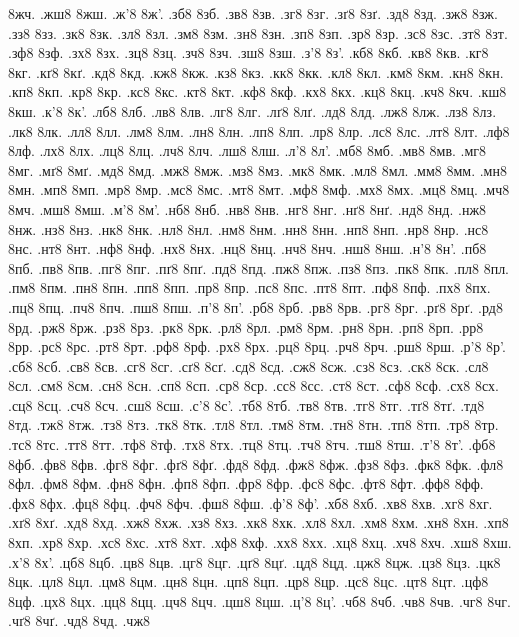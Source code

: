 {8жч.
.жш8
8жш.
.ж'8
8ж'.
.зб8
8зб.
.зв8
8зв.
.зг8
8зг.
.зґ8
8зґ.
.зд8
8зд.
.зж8
8зж.
.зз8
8зз.
.зк8
8зк.
.зл8
8зл.
.зм8
8зм.
.зн8
8зн.
.зп8
8зп.
.зр8
8зр.
.зс8
8зс.
.зт8
8зт.
.зф8
8зф.
.зх8
8зх.
.зц8
8зц.
.зч8
8зч.
.зш8
8зш.
.з'8
8з'.
.кб8
8кб.
.кв8
8кв.
.кг8
8кг.
.кґ8
8кґ.
.кд8
8кд.
.кж8
8кж.
.кз8
8кз.
.кк8
8кк.
.кл8
8кл.
.км8
8км.
.кн8
8кн.
.кп8
8кп.
.кр8
8кр.
.кс8
8кс.
.кт8
8кт.
.кф8
8кф.
.кх8
8кх.
.кц8
8кц.
.кч8
8кч.
.кш8
8кш.
.к'8
8к'.
.лб8
8лб.
.лв8
8лв.
.лг8
8лг.
.лґ8
8лґ.
.лд8
8лд.
.лж8
8лж.
.лз8
8лз.
.лк8
8лк.
.лл8
8лл.
.лм8
8лм.
.лн8
8лн.
.лп8
8лп.
.лр8
8лр.
.лс8
8лс.
.лт8
8лт.
.лф8
8лф.
.лх8
8лх.
.лц8
8лц.
.лч8
8лч.
.лш8
8лш.
.л'8
8л'.
.мб8
8мб.
.мв8
8мв.
.мг8
8мг.
.мґ8
8мґ.
.мд8
8мд.
.мж8
8мж.
.мз8
8мз.
.мк8
8мк.
.мл8
8мл.
.мм8
8мм.
.мн8
8мн.
.мп8
8мп.
.мр8
8мр.
.мс8
8мс.
.мт8
8мт.
.мф8
8мф.
.мх8
8мх.
.мц8
8мц.
.мч8
8мч.
.мш8
8мш.
.м'8
8м'.
.нб8
8нб.
.нв8
8нв.
.нг8
8нг.
.нґ8
8нґ.
.нд8
8нд.
.нж8
8нж.
.нз8
8нз.
.нк8
8нк.
.нл8
8нл.
.нм8
8нм.
.нн8
8нн.
.нп8
8нп.
.нр8
8нр.
.нс8
8нс.
.нт8
8нт.
.нф8
8нф.
.нх8
8нх.
.нц8
8нц.
.нч8
8нч.
.нш8
8нш.
.н'8
8н'.
.пб8
8пб.
.пв8
8пв.
.пг8
8пг.
.пґ8
8пґ.
.пд8
8пд.
.пж8
8пж.
.пз8
8пз.
.пк8
8пк.
.пл8
8пл.
.пм8
8пм.
.пн8
8пн.
.пп8
8пп.
.пр8
8пр.
.пс8
8пс.
.пт8
8пт.
.пф8
8пф.
.пх8
8пх.
.пц8
8пц.
.пч8
8пч.
.пш8
8пш.
.п'8
8п'.
.рб8
8рб.
.рв8
8рв.
.рг8
8рг.
.рґ8
8рґ.
.рд8
8рд.
.рж8
8рж.
.рз8
8рз.
.рк8
8рк.
.рл8
8рл.
.рм8
8рм.
.рн8
8рн.
.рп8
8рп.
.рр8
8рр.
.рс8
8рс.
.рт8
8рт.
.рф8
8рф.
.рх8
8рх.
.рц8
8рц.
.рч8
8рч.
.рш8
8рш.
.р'8
8р'.
.сб8
8сб.
.св8
8св.
.сг8
8сг.
.сґ8
8сґ.
.сд8
8сд.
.сж8
8сж.
.сз8
8сз.
.ск8
8ск.
.сл8
8сл.
.см8
8см.
.сн8
8сн.
.сп8
8сп.
.ср8
8ср.
.сс8
8сс.
.ст8
8ст.
.сф8
8сф.
.сх8
8сх.
.сц8
8сц.
.сч8
8сч.
.сш8
8сш.
.с'8
8с'.
.тб8
8тб.
.тв8
8тв.
.тг8
8тг.
.тґ8
8тґ.
.тд8
8тд.
.тж8
8тж.
.тз8
8тз.
.тк8
8тк.
.тл8
8тл.
.тм8
8тм.
.тн8
8тн.
.тп8
8тп.
.тр8
8тр.
.тс8
8тс.
.тт8
8тт.
.тф8
8тф.
.тх8
8тх.
.тц8
8тц.
.тч8
8тч.
.тш8
8тш.
.т'8
8т'.
.фб8
8фб.
.фв8
8фв.
.фг8
8фг.
.фґ8
8фґ.
.фд8
8фд.
.фж8
8фж.
.фз8
8фз.
.фк8
8фк.
.фл8
8фл.
.фм8
8фм.
.фн8
8фн.
.фп8
8фп.
.фр8
8фр.
.фс8
8фс.
.фт8
8фт.
.фф8
8фф.
.фх8
8фх.
.фц8
8фц.
.фч8
8фч.
.фш8
8фш.
.ф'8
8ф'.
.хб8
8хб.
.хв8
8хв.
.хг8
8хг.
.хґ8
8хґ.
.хд8
8хд.
.хж8
8хж.
.хз8
8хз.
.хк8
8хк.
.хл8
8хл.
.хм8
8хм.
.хн8
8хн.
.хп8
8хп.
.хр8
8хр.
.хс8
8хс.
.хт8
8хт.
.хф8
8хф.
.хх8
8хх.
.хц8
8хц.
.хч8
8хч.
.хш8
8хш.
.х'8
8х'.
.цб8
8цб.
.цв8
8цв.
.цг8
8цг.
.цґ8
8цґ.
.цд8
8цд.
.цж8
8цж.
.цз8
8цз.
.цк8
8цк.
.цл8
8цл.
.цм8
8цм.
.цн8
8цн.
.цп8
8цп.
.цр8
8цр.
.цс8
8цс.
.цт8
8цт.
.цф8
8цф.
.цх8
8цх.
.цц8
8цц.
.цч8
8цч.
.цш8
8цш.
.ц'8
8ц'.
.чб8
8чб.
.чв8
8чв.
.чг8
8чг.
.чґ8
8чґ.
.чд8
8чд.
.чж8
}
